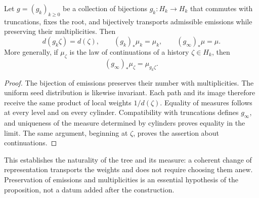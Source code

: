 \begin{proposition}
\label{prop:ch-naturalidad-medida}
Let \(g=(g_k)_{k\geq0}\) be a collection of bijections \(g_k:H_k\to H_k\)
that commutes with truncations, fixes the root, and bijectively transports
admissible emissions while preserving their multiplicities. Then
\[
 d(g_k\zeta)=d(\zeta),\qquad
 (g_k)_*\mu_k=\mu_k,\qquad (g_\infty)_*\mu=\mu.
\]
More generally, if \(\mu_\zeta\) is the law of continuations of a
history \(\zeta\in H_k\), then
\[
 (g_\infty)_*\mu_\zeta=\mu_{g_k\zeta}.
\]
\end{proposition}

\begin{proof}
The bijection of emissions preserves their number with multiplicities. The
uniform seed distribution is likewise invariant. Each path
and its image therefore receive the same product of local weights
\(1/d(\zeta)\). Equality of measures follows at every level and on
every cylinder. Compatibility with truncations defines \(g_\infty\),
and uniqueness of the measure determined by cylinders proves equality
in the limit. The same argument, beginning at \(\zeta\), proves the
assertion about continuations.
\end{proof}

This establishes the naturality of the tree and its measure: a coherent change
of representation transports the weights and does not require choosing them anew.
Preservation of emissions and multiplicities is an essential hypothesis of
the proposition, not a datum added after the construction.
